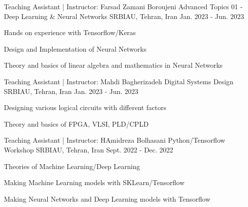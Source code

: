 


\begin{cventries}


\cventry
{Teaching Assistant | Instructor: Farsad Zamani Boroujeni} %
{Advanced Topics 01 - Deep Learning \& Neural Networks} %
{SRBIAU, Tehran, Iran} %
{Jan. 2023 - Jun. 2023} %
{ %
\begin{cvitems}
\item {Hands on experience with Tensorflow/Keras}
\item {Design and Implementation of Neural Networks}
\item {Theory and basics of linear algebra and mathematics in Neural Networks}
\end{cvitems}
}


\cventry
{Teaching Assistant | Instructor: Mahdi Bagherizadeh} %
{Digital Systems Design} %
{SRBIAU, Tehran, Iran} %
{Jan. 2023 - Jun. 2023} %
{ %
\begin{cvitems}
\item {Designing various logical circuits with different factors}
\item {Theory and basics of FPGA, VLSI, PLD/CPLD}
\end{cvitems}
}


\cventry
{Teaching Assistant | Instructor: HAmidreza Bolhasani} %
{Python/Tensorflow Workshop} %
{SRBIAU, Tehran, Iran} %
{Sept. 2022 - Dec. 2022} %
{ %
\begin{cvitems}
\item {Theories of Machine Learning/Deep Learning}
\item {Making Machine Learning models with SKLearn/Tensorflow}
\item {Making Neural Networks and Deep Learning models with Tensorflow} 
\end{cvitems} 
}


\end{cventries}
